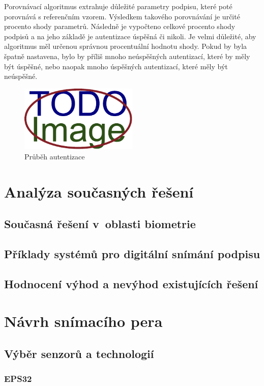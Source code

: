 Porovnávací algoritmus extrahuje důležité parametry podpisu, které poté porovnává s referenčním vzorem. 
Výsledkem takového porovnávání je určité procento shody parametrů.
Následně je vypočteno celkové procento shody podpisů a na jeho základě je autentizace úspěšná či nikoli.
Je velmi důležité, aby algoritmus měl určenou správnou procentuální hodnotu shody.
Pokud by byla špatně nastavena, bylo by příliš mnoho neúspěšných autentizací, které by měly být úspěšné, nebo naopak mnoho úspěšných autentizací, které měly být neúspěšné.


\begin{figure}[h]
\centering
\includegraphics[width=0.5\textwidth]{obrazky-figures/placeholder.pdf}
\caption{Průběh autentizace}
\label{fig:my-pdf}
\end{figure}

\chapter{Analýza současných řešení}
\section{Současná řešení v~oblasti biometrie}
\section{Příklady systémů pro digitální snímání podpisu}
\section{Hodnocení výhod a nevýhod existujících řešení}

\chapter{Návrh snímacího pera}
\section{Výběr senzorů a technologií}
\subsection{EPS32}
